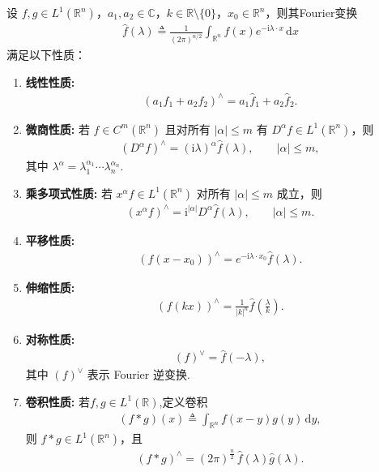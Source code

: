 \documentclass[../../main.tex]{subfiles}%
\begin{document}
\begin{proposition}\label{proposition:Fourier 变换的基本性质2}
设 $f,g\in L^1(\mathbb{R}^n)$，$a_1,a_2\in\mathbb{C}$，$k\in\mathbb{R}\setminus\{0\}$，$x_0\in\mathbb{R}^n$，则其Fourier变换
\begin{align*}
\hat{f}(\lambda)\triangleq \frac{1}{(2\pi)^{n/2}}\int_{\mathbb{R}^n} f(x)e^{-\mathrm{i}\lambda\cdot x}\,\mathrm{d}x
\end{align*}
满足以下性质：
\begin{enumerate}[(1)]
\item \textbf{线性性质:}
\begin{align*}
(a_1f_1+a_2f_2)^\wedge=a_1\hat{f}_1+a_2\hat{f}_2.
\end{align*}

\item \textbf{微商性质:} 若 $f\in C^m(\mathbb{R}^n)$ 且对所有 $|\alpha|\leqslant m$ 有 $D^\alpha f\in L^1(\mathbb{R}^n)$，则
\begin{align*}
(D^\alpha f)^\wedge=(\mathrm{i}\lambda)^\alpha \hat{f}(\lambda),\qquad |\alpha|\leqslant m,
\end{align*}
其中 $\lambda^\alpha=\lambda_1^{\alpha_1}\cdots\lambda_n^{\alpha_n}$.

\item \textbf{乘多项式性质:} 若 $x^\alpha f\in L^1(\mathbb{R}^n)$ 对所有 $|\alpha|\leqslant m$ 成立，则
\begin{align*}
(x^\alpha f)^\wedge=\mathrm{i}^{|\alpha|}D^\alpha \hat{f}(\lambda),\qquad |\alpha|\leqslant m.
\end{align*}

\item \textbf{平移性质:}
\begin{align*}
(f(x-x_0))^\wedge=e^{-\mathrm{i}\lambda\cdot x_0}\hat{f}(\lambda).
\end{align*}

\item \textbf{伸缩性质:}
\begin{align*}
(f(kx))^\wedge=\frac{1}{|k|^n}\hat{f}\left(\frac{\lambda}{k}\right).
\end{align*}

\item \textbf{对称性质:}
\begin{align*}
(f)^\vee=\hat{f}(-\lambda),
\end{align*}
其中 $(f)^\vee$ 表示 Fourier 逆变换.

\item \textbf{卷积性质:} 若$f,g\in L^1(\mathbb{R})$,定义卷积
\begin{align*}
(f*g)(x)\triangleq\int_{\mathbb{R}^n} f(x-y)g(y)\,\mathrm{d}y,
\end{align*}
则 $f*g\in L^1(\mathbb{R}^n)$，且
\begin{align*}
(f*g)^\wedge=(2\pi)^{\frac{n}{2}}\,\hat{f}(\lambda)\hat{g}(\lambda).
\end{align*}


\end{enumerate}
\end{proposition}
\end{document}
